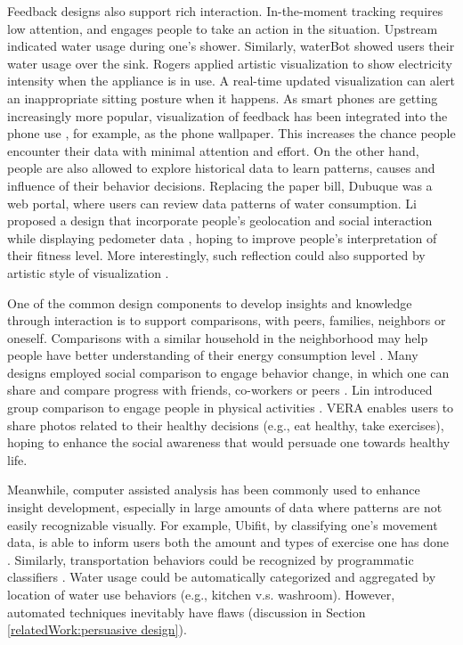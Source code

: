 \documentclass[12pt,oneside]{book}
\begin{document}
Feedback designs also support rich interaction.  In-the-moment tracking requires low attention, and engages people to take an action in the situation.  Upstream \cite{kuznetsov_upstream:_2010} indicated water usage during one's shower.  Similarly, waterBot \cite{arroyo_waterbot:_2005} showed users their water usage over the sink.  Rogers \cite{rogers_ambient_2010} applied artistic visualization to show electricity intensity when the appliance is in use.  A real-time updated visualization can alert an inappropriate sitting posture when it happens\cite{haller_finding_2011}.  As smart phones are getting increasingly more popular, visualization of feedback has been integrated into the phone use \cite{consolvo_flowers_2008, froehlich_ubigreen:_2009,bauer_shuteye:_2012}, for example, as the phone wallpaper.  This increases the chance people encounter their data with minimal attention and effort.  On the other hand, people are also allowed to explore historical data to learn patterns, causes and influence of their behavior decisions.  Replacing the paper bill, Dubuque \cite{erickson_dubuque_2013} was a web portal, where users can review data patterns of water consumption. Li proposed a design that incorporate people's geolocation and social interaction while displaying pedometer data \cite{li_using_2012}, hoping to improve people's interpretation of their fitness level. More interestingly, such reflection could also supported by artistic style of visualization \cite{fan_spark_2012}. 

One of the common design components to develop insights and knowledge through interaction is to support comparisons, with peers, families, neighbors or oneself.  Comparisons with a similar household in the neighborhood may help people have better understanding of their energy consumption level \cite{erickson_dubuque_2013,moere_comparative_2011}. Many designs employed social comparison to engage behavior change, in which one can share and compare progress with friends, co-workers or peers \cite{obrien_jogging_2007, baumer_prescriptive_2012, lin_fishnsteps:_2006,chiu_playful_2009}.  Lin introduced group comparison to engage people in physical activities \cite{lin_fishnsteps:_2006}. VERA \cite{baumer_prescriptive_2012} enables users to share photos related to their healthy decisions (e.g., eat healthy, take exercises), hoping to enhance the social awareness that would persuade one towards healthy life.

Meanwhile, computer assisted analysis has been commonly used to enhance insight development, especially in large amounts of data where patterns are not easily recognizable visually. For example, Ubifit, by classifying one's movement data, is able to inform users both the amount and types of exercise one has done \cite{consolvo_flowers_2008}.  Similarly, transportation behaviors could be recognized by programmatic classifiers \cite{froehlich_ubigreen:_2009}.  Water usage could be automatically categorized and aggregated by location of water use behaviors (e.g., kitchen v.s. washroom).  However, automated techniques inevitably have flaws (discussion in Section \ref{relatedWork:persuasive design}).
\end{document}
